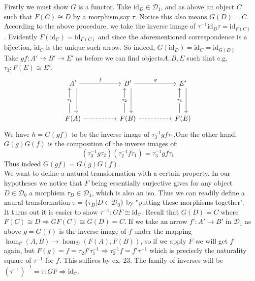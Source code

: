 \documentclass[11pt]{article}
\theoremstyle{plain}
\theoremstyle{definition}
\theoremstyle{remark}
\newcommand{\cC}{\mathcal{C}}
\newcommand{\cD}{\mathcal{D}}
\newcommand{\id}{\mathrm{id}}
\begin{document}
 Firstly we must show $G$ is a functor. Take $\id_D \in \cD_1$, and as above an object $C$ such that $F(C) \cong D$ by a morphism,say $\tau$. Notice this also means $G(D)=C$. According to the above procedure, we take the inverse image of $\tau^{-1} \id_D \tau=\id_{F(C)}$. Evidently $F(\id_C)=\id_{F(C)}$ and since the aforementioned correspondence is a bijection, $\id_C$ is the unique such arrow. So indeed, $G(\id_D)=\id_C=\id_{G(D)}$\\
 Take $gf:A' \to B' \to E'$ as before we can find objects$A,B,E$ such that e.g. $\tau_3:F(E) \cong E'$. 
\[\begin{tikzcd}
	{A'} && {B'} && {E'} \\
	\\
	{F(A)} && {F(B)} && {F(E)}
	\arrow["{f}", from=1-1, to=1-3]
	\arrow[from=1-1, to=3-1, shift left=2]
	\arrow[from=3-1, to=3-3, dashed]
	\arrow["{\tau_1}" description, from=3-1, to=1-1, shift left=2]
	\arrow["{\tau_2}" description, from=3-3, to=1-3, shift left=2]
	\arrow[from=1-3, to=3-3, shift left=2]
	\arrow["{g}", from=1-3, to=1-5]
	\arrow[from=3-3, to=3-5, dashed]
	\arrow["{\tau_3}" description, from=3-5, to=1-5, shift left=2]
	\arrow[from=1-5, to=3-5, shift left=2]
\end{tikzcd}\]
We have $h=G(gf)$ to be the inverse image of $\tau_3^{-1} gf \tau_1$.One the other hand, $G(g)G(f)$ is the composition of the inverse images of: \[ (\tau_3^{-1} g \tau_2) (\tau_2^{-1} f \tau_1)=\tau_3^{-1} gf \tau_1\] 
 Thus indeed $G(gf)=G(g)G(f)$.\\
 We want to define a natural transformation with a certain property. In our hypotheses we notice that $F$ being essentially surjective gives for any object $D \in \cD_0$ a morphism $\tau_D \in \cD_1$, which is also an iso. Thus we can readily define a naural transformation $\tau=\{\tau_D|D \in \cD_0\}$ by "putting these morphisms together".
 It turns out it is easier to show $\tau^{-1}:GF\cong \id_{\cC}$. Recall that $G(D)=C$ where $F(C)\cong D \Rightarrow GF(C) \cong G(D)=C$. If we take an arrow $f':A' \to B'$ in $\cD_1$ as above $g=G(f)$ is the inverse image of $f$ under the mapping $\hom_{\cC}(A,B) \to \hom_{\cD}(F(A),F(B))$, so if we apply $F$ we will get $f$ again, but $F(g)=f=\tau_2 f' \tau_1^{-1} \Rightarrow \tau_2^{-1}f=f'\tau^{-1}$ which is preciecly the naturality square of $\tau^{-1}$ for $f$.
  This suffices by ex. 23. The family of inverses will be $(\tau^{-1})^{-1}=\tau:GF \Rightarrow \id_{\cC}$.
  
\end{document}

